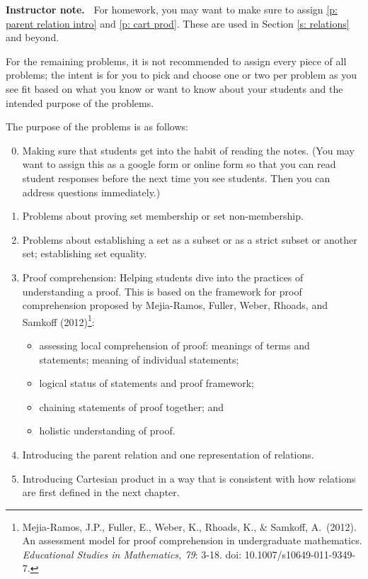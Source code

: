 \documentclass[11pt]{article}
\newenvironment{bignote}[1][Instructor note]%
	{\begin{mdframed}\raggedright{\bf #1.~}}
	{\end{mdframed}}
\theoremstyle{definition}
\begin{document}
\begin{bignote}
For homework, you may want to make sure to assign \ref{p: parent relation intro} and \ref{p: cart prod}. These are used in Section \ref{s: relations} and beyond. 

For the remaining problems, it is not recommended to assign every piece of all problems; the intent is for you to pick and choose one or two per problem as you see fit based on what you know or want to know about your students and the intended purpose of the problems.

The purpose of the problems is as follows:
	\begin{enumerate}
	\setcounter{enumi}{-1}
	\item Making sure that students get into the habit of reading the notes. (You may want to assign this as a google form or online form so that you can read student responses before the next time you see students. Then you can address questions immediately.)
	\item Problems about proving set membership or set non-membership.
	\item Problems about establishing a set as a subset or as a strict subset or another set; establishing set equality.
	\item Proof comprehension: Helping students dive into the practices of understanding a proof. This is based on the framework for proof comprehension proposed by Mejia-Ramos, Fuller, Weber, Rhoads, and Samkoff (2012)\footnote{\footnotesize{Mejia-Ramos, J.P., Fuller, E., Weber, K., Rhoads, K., \& Samkoff, A.~(2012). An assessment model for proof comprehension in undergraduate mathematics. {\it Educational Studies in Mathematics, 79}: 3-18. doi: 10.1007/s10649-011-9349-7.}}: 	
		\begin{itemize}
		\item assessing local comprehension of proof: meanings of terms and statements; meaning of individual statements;
		\item logical status of statements and proof framework;
		\item chaining statements of proof together; and 
		\item holistic understanding of proof.
		\end{itemize}
	\item Introducing the parent relation and one representation of relations.
	\item Introducing Cartesian product in a way that is consistent with how relations are first defined in the next chapter.
	\end{enumerate}
\end{bignote}
\end{document}
